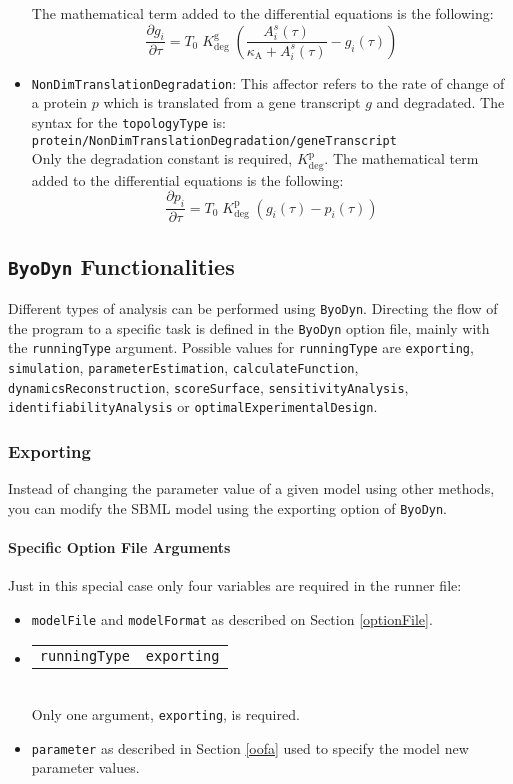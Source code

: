 \documentclass[a4paper, 11pt]{article}
\begin{document}
\begin{itemize}
  The mathematical term added to the differential equations is the following:
  \begin{equation}
    \frac{\partial g_i}{\partial \tau} = T_0\;K_{\mathrm{deg}}^{\mathrm{g}}\;\left(\frac{A_{i}^{s}(\tau)}{\kappa_{\mathrm{A}}+A_{i}^{s}(\tau)}-g_{i}(\tau)\right)
  \end{equation}
\item \texttt{NonDimTranslationDegradation}:
  This affector refers to the rate of change of a protein $p$ which is translated from a gene transcript $g$ and degradated.
  The syntax for the \texttt{topologyType} is:\\[1.5ex]
  \texttt{protein/NonDimTranslationDegradation/geneTranscript}\\[1.5ex]
  Only the degradation constant is required, $K_{\mathrm{deg}}^{\mathrm{p}}$.
  The mathematical term added to the differential equations is the following:
  \begin{equation}
    \frac{\partial p_i}{\partial \tau} = T_0\;K_{\mathrm{deg}}^{\mathrm{p}}\;\left(g_{i}(\tau)-p_{i}(\tau)\right)
  \end{equation}
\end{itemize}
\subsection{\texttt{ByoDyn} Functionalities}\label{functionalities} 
Different types of analysis can be performed using \texttt{ByoDyn}.
Directing the flow of the program to a specific task is defined in the \texttt{ByoDyn} option file, mainly with the \texttt{runningType} argument.
Possible values for \texttt{runningType} are \texttt{exporting}, \texttt{simulation}, \texttt{parameterEstimation}, \texttt{calculateFunction}, \texttt{dynamicsReconstruction}, \texttt{scoreSurface}, \texttt{sensitivityAnalysis}, \texttt{identifiabilityAnalysis} or \texttt{optimalExperimentalDesign}. 
\subsubsection{Exporting}
Instead of changing the parameter value of a given model using other methods, you can modify the SBML model using the exporting option of \texttt{ByoDyn}.
\paragraph{Specific Option File Arguments}
Just in this special case only four variables are required in the runner file:
\begin{itemize}
\item \texttt{modelFile} and \texttt{modelFormat} as described on Section \ref{optionFile}.
\item \begin{tabular}{cc}\texttt{runningType}&\texttt{exporting}\end{tabular}\\[1.5ex]
  Only one argument, \texttt{exporting}, is required.
\item \texttt{parameter} as described in Section \ref{oofa} used to specify the model new parameter values.
\end{itemize}
\end{document}
